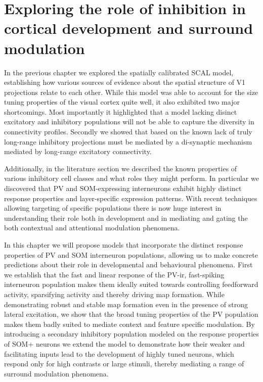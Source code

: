 \chapter{Exploring the role of inhibition in cortical development and surround modulation}

In the previous chapter we explored the spatially calibrated SCAL
model, establishing how various sources of evidence about the spatial
structure of V1 projections relate to each other. While this model was
able to account for the size tuning properties of the visual cortex
quite well, it also exhibited two major shortcomings. Most importantly
it highlighted that a model lacking disinct excitatory and inhibitory
populations will not be able to capture the diversity in connectivity
profiles. Secondly we showed that based on the known lack of truly
long-range inhibitory projections must be mediated by a di-synaptic
mechanism mediated by long-range excitatory connectivity.

Additionally, in the literature section we described the known
properties of various inhibitory cell classes and what roles they
might perform. In particular we discovered that PV and SOM-expressing
interneurons exhibit highly distinct response properties and
layer-specific expression patterns.  With recent techniques allowing
targeting of specific populations there is now huge interest in
understanding their role both in development and in mediating and
gating the both contextual and attentional modulation phenomena.

In this chapter we will propose models that incorporate the distinct
response properties of PV and SOM interneuron populations, allowing us
to make concrete predictions about their role in developmental and
behavioural phenomena. First we establish that the fast and linear
response of the PV-ir, fast-spiking interneuron population makes them
ideally suited towards controlling feedforward activity, sparsifying
activity and thereby driving map formation. While demonstrating robust
and stable map formation even in the presence of strong lateral
excitation, we show that the broad tuning properties of the PV
population makes them badly suited to mediate context and feature
specific modulation. By introducing a secondary inhibitory population
modeled on the response properties of SOM+ neurons we extend the model
to demonstrate how their weaker and facilitating inputs
\citep{Bartley2008,Beierlein2003,Bartley2008,Tan2008} lead to the
development of highly tuned neurons, which respond only for high
contrasts or large stimuli, thereby mediating a range of surround
modulation phenomena.

